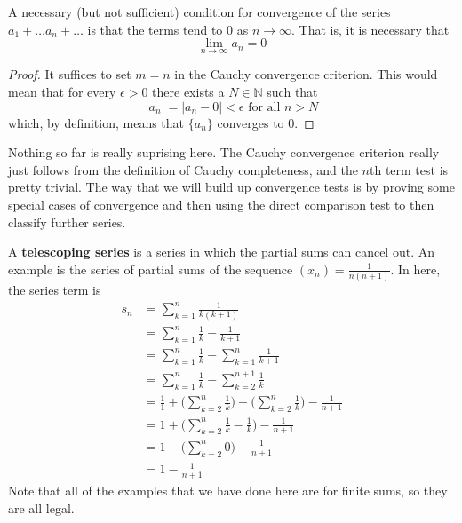   \begin{corollary}
    A necessary (but not sufficient) condition for convergence of the series $a_1 + \ldots a_n + \ldots$ is that the terms tend to $0$ as $n \rightarrow \infty$. That is, it is necessary that
    \begin{equation}
      \lim_{n\rightarrow \infty} a_n = 0
    \end{equation}
  \end{corollary}
  \begin{proof}
    It suffices to set $m = n$ in the Cauchy convergence criterion. This would mean that for every $\epsilon > 0$ there exists a $N \in \mathbb{N}$ such that 
    \begin{equation}
      |a_n| = |a_n - 0| < \epsilon \text{ for all } n > N
    \end{equation}
    which, by definition, means that $\{a_n\}$ converges to $0$. 
  \end{proof} 

  Nothing so far is really suprising here. The Cauchy convergence criterion really just follows from the definition of Cauchy completeness, and the $n$th term test is pretty trivial. The way that we will build up convergence tests is by proving some special cases of convergence and then using the direct comparison test to then classify further series.     

  \begin{example}
    A \textbf{telescoping series} is a series in which the partial sums can cancel out. An example is the series of partial sums of the sequence $(x_n) = \frac{1}{n (n+1)}$. In here, the series term is
    \begin{align}
      s_n & = \sum_{k=1}^n \frac{1}{k(k+1)} \\ 
          & = \sum_{k=1}^n \frac{1}{k} - \frac{1}{k+1} \\
          & = \sum_{k=1}^n \frac{1}{k} - \sum_{k=1}^n \frac{1}{k+1} \\
          & = \sum_{k=1}^n \frac{1}{k} - \sum_{k=2}^{n+1} \frac{1}{k} \\
          & = \frac{1}{1} + \bigg( \sum_{k=2}^n \frac{1}{k} \bigg) - \bigg( \sum_{k=2}^n \frac{1}{k} \bigg) - \frac{1}{n+1} \\
          & = 1 + \bigg( \sum_{k=2}^n \frac{1}{k} - \frac{1}{k} \bigg) - \frac{1}{n+1} \\
          & = 1 - \bigg( \sum_{k=2}^n 0 \bigg) - \frac{1}{n+1} \\
          & = 1 - \frac{1}{n+1} 
    \end{align} 
    Note that all of the examples that we have done here are for finite sums, so they are all legal. 
  \end{example}

